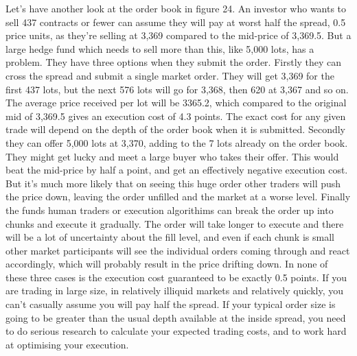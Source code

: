 \begin{englishblock} Let's have another look at the order book in figure 24. An investor who wants to sell 437 contracts or fewer can assume they will pay at worst half the spread, 0.5 price units, as they're selling at 3,369 compared to the mid-price of 3,369.5. But a large hedge fund which needs to sell more than this, like 5,000 lots, has a problem. They have three options when they submit the order. Firstly they can cross the spread and submit a single market order. They will get 3,369 for the first 437 lots, but the next 576 lots will go for 3,368, then 620 at 3,367 and so on. The average price received per lot will be 3365.2, which compared to the original mid of 3,369.5 gives an execution cost of 4.3 points. The exact cost for any given trade will depend on the depth of the order book when it is submitted. Secondly they can offer 5,000 lots at 3,370, adding to the 7 lots already on the order book. They might get lucky and meet a large buyer who takes their offer. This would beat the mid-price by half a point, and get an effectively negative execution cost. But it's much more likely that on seeing this huge order other traders will push the price down, leaving the order unfilled and the market at a worse level. Finally the funds human traders or execution algorithims can break the order up into chunks and execute it gradually. The order will take longer to execute and there will be a lot of uncertainty about the fill level, and even if each chunk is small other market participants will see the individual orders coming through and react accordingly, which will probably result in the price drifting down. In none of these three cases is the execution cost guaranteed to be exactly 0.5 points. If you are trading in large size, in relatively illiquid markets and relatively quickly, you can't casually assume you will pay half the spread. If your typical order size is going to be greater than the usual depth available at the inside spread, you need to do serious research to calculate your expected trading costs, and to work hard at optimising your execution. \end{englishblock}

